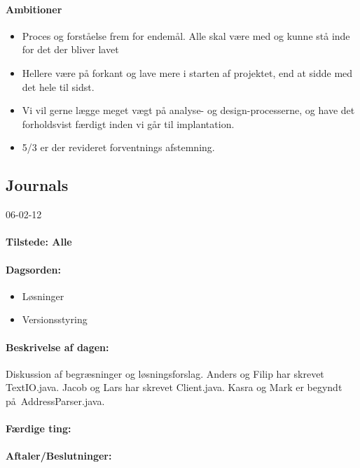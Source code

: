 \documentclass[a4paper,10pt,titlepage]{article}
\begin{document}
\paragraph{Ambitioner}
\begin{itemize}
\item Proces og forståelse frem for endemål. Alle skal være med og kunne stå inde for det der bliver lavet
\item Hellere være på forkant og lave mere i starten af projektet, end at sidde med det hele til sidst.
\item Vi vil gerne lægge meget vægt på analyse- og design-processerne, og have det forholdsvist færdigt inden vi går til implantation.
\item 5/3 er der revideret forventnings afstemning.
\end{itemize}
	\newpage

	\subsection{Journals}		
		\begin{center}
		06-02-12
		\end{center}
				\paragraph{Tilstede: Alle}
				\paragraph{Dagsorden:}
				\begin{itemize}
					\item L\o sninger
					\item Versionsstyring
				\end{itemize}	
			\paragraph{Beskrivelse af dagen:}
			Diskussion af begr\ae sninger og l\o sningsforslag. Anders og Filip har skrevet TextIO.java. Jacob og Lars har skrevet Client.java. Kasra og Mark er begyndt p\aa \ AddressParser.java.
			\paragraph{F\ae rdige ting:}
			
			\paragraph{Aftaler/Beslutninger:}
			
\end{document}

